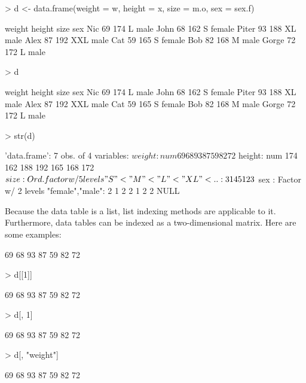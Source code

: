 \documentclass[a4paper,11pt]{scrartcl}
\begin{document}
\begin{Schunk}
\begin{Sinput}
> d <- data.frame(weight = w, height = x, size = m.o, sex = sex.f)
\end{Sinput}
\begin{Soutput}
      weight height size    sex
Nic       69    174    L   male
John      68    162    S female
Piter     93    188   XL   male
Alex      87    192  XXL   male
Cat       59    165    S female
Bob       82    168    M   male
Gorge     72    172    L   male
\end{Soutput}
\begin{Sinput}
> d
\end{Sinput}
\begin{Soutput}
      weight height size    sex
Nic       69    174    L   male
John      68    162    S female
Piter     93    188   XL   male
Alex      87    192  XXL   male
Cat       59    165    S female
Bob       82    168    M   male
Gorge     72    172    L   male
\end{Soutput}
\begin{Sinput}
> str(d)
\end{Sinput}
\begin{Soutput}
'data.frame':	7 obs. of  4 variables:
 $ weight: num  69 68 93 87 59 82 72
 $ height: num  174 162 188 192 165 168 172
 $ size  : Ord.factor w/ 5 levels "S"<"M"<"L"<"XL"<..: 3 1 4 5 1 2 3
 $ sex   : Factor w/ 2 levels "female","male": 2 1 2 2 1 2 2
NULL
\end{Soutput}
\end{Schunk}



Because the data table is a list, list indexing methods are applicable to it. Furthermore, data tables can be indexed as a two-dimensional matrix. Here are some examples:

\begin{Schunk}
\begin{Soutput}
[1] 69 68 93 87 59 82 72
\end{Soutput}
\begin{Sinput}
> d[[1]]
\end{Sinput}
\begin{Soutput}
[1] 69 68 93 87 59 82 72
\end{Soutput}
\begin{Sinput}
> d[, 1]
\end{Sinput}
\begin{Soutput}
[1] 69 68 93 87 59 82 72
\end{Soutput}
\begin{Sinput}
> d[, "weight"]
\end{Sinput}
\begin{Soutput}
[1] 69 68 93 87 59 82 72
\end{Soutput}
\end{Schunk}
\end{document}
